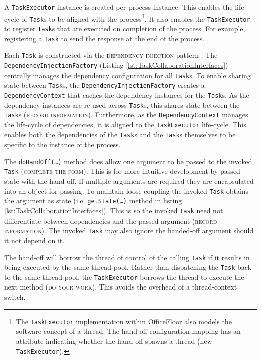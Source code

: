\documentclass[prodmode]{style/acmlarge}
\begin{document}
A \texttt{TaskExecutor} instance is created per process instance.  This enables
the life-cycle of \texttt{Task}s to be aligned with the process\footnote{The
\texttt{TaskExecutor} implementation within OfficeFloor also models the software
concept of a thread.  The hand-off configuration mapping has an attribute
indicating whether the hand-off spawns a thread (new \texttt{TaskExecutor}).}.
It also enables the \texttt{TaskExecutor} to register \texttt{Task}s that are
executed on completion of the process.  For example, registering a \texttt{Task}
to send the response at the end of the process.

Each \texttt{Task} is constructed via the \textsc{dependency injection} pattern
\cite{ioc}.  The \texttt{Dependency\-InjectionFactory} (Listing
\ref{lst:TaskCollaborationInterfaces}) centrally manages the dependency
configuration for all \texttt{Task}s.  To enable sharing state between
\texttt{Task}s, the \texttt{Dependency\-InjectionFactory} creates a
\texttt{Depend\-ency\-Context} that caches the dependency instances for the
\texttt{Task}s.  As the dependency instances are re-used across \texttt{Task}s,
this shares state between the \texttt{Task}s (\textsc{record information}).
Furthermore, as the \texttt{Dependency\-Context} manages the life-cycle of
dependencies, it is aligned to the \texttt{TaskExecutor} life-cycle.
This enables both the dependencies of the \texttt{Task}s and the \texttt{Task}s
themselves to be specific to the instance of the process.

The \texttt{doHandOff(\ldots)} method does allow one argument to be passed to
the invoked \texttt{Task} (\textsc{complete the form}).  This is for more
intuitive development by passed state with the hand-off.  If multiple arguments
are required they are encapsulated into an object for passing.  To maintain
loose coupling the invoked \texttt{Task} obtains the argument as state (i.e.
\texttt{getState(\ldots)} method in listing
\ref{lst:TaskCollaborationInterfaces}).  This is so the invoked \texttt{Task}
need not differentiate between dependencies and the passed argument
(\textsc{record information}).  The invoked \texttt{Task} may also ignore the
handed-off argument should it not depend on it.

The hand-off will borrow the thread of control of the calling \texttt{Task} if
it results in being executed by the same thread pool.  Rather than dispatching
the \texttt{Task} back to the same thread pool, the \texttt{TaskExecutor}
borrows the thread to execute the next method (\textsc{do your work}). This
avoids the overhead of a thread-context switch.
\end{document}
